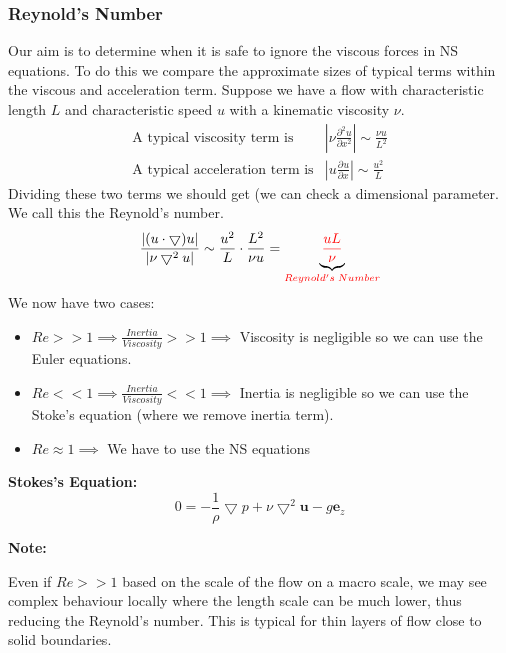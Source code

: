 \documentclass[11pt]{article}
\newcommand*{\pd}[3][]{\ensuremath{\frac{\partial^{#1} {#2}}{\partial {#3}^{#1}}}}
\newcommand{\grad}{\bigtriangledown}
\newcommand{\mv}[1]{\textbf{#1}}
\newcommand{\mdf}[1]{{\color{red}#1}}
\newenvironment{note}
    {\textbf{Note:}\begin{mdframed}[backgroundcolor=white, roundcorner=5pt, linewidth=0pt]}
    {\end{mdframed}}
\newenvironment{formula}
	{\begin{mdframed}[backgroundcolor=white, roundcorner=5pt, linewidth=1pt, linecolor=red]}
	{\end{mdframed}}
\begin{document}
\subsubsection{Reynold's Number}
Our aim is to determine when it is safe to ignore the viscous forces in NS equations.
To do this we compare the approximate sizes of typical terms within the viscous and acceleration term.
Suppose we have a flow with characteristic length $L$ and characteristic speed $u$ with a kinematic viscosity $\nu$.
\begin{align*}
	\text{A typical viscosity term is} &\left|\nu\pd[2]{u}{x}\right|\sim\frac{\nu u}{L^2}\\
	\text{A typical acceleration term is} &\left|u\pd{u}{x}\right|\sim\frac{u^2}{L}
\end{align*}
Dividing these two terms we should get (we can check a dimensional parameter. We call this the \mdf{Reynold's number}.
$$\frac{|(u\cdot\grad)u|}{|\nu\grad^2 u|}\sim \frac{u^2}{L}\cdot\frac{L^2}{\nu u}=\underbrace{\mdf{\frac{uL}{\nu}}}_{\mdf{Reynold's\;Number}}$$
We now have two cases:
\begin{itemize}
	\item $Re >> 1 \implies \frac{Inertia}{Viscosity} >> 1 \implies$ Viscosity is negligible so we can use the Euler equations.
	\item $Re << 1 \implies \frac{Inertia}{Viscosity} << 1 \implies$ Inertia is negligible so we can use the Stoke's equation (where we remove inertia term).
	\item $Re \approx 1 \implies$ We have to use the NS equations
\end{itemize}
\begin{formula}
	\textbf{Stokes's Equation:}
	$$0=-\frac{1}{\rho}\grad{p}+\nu\grad^2\mv{u}-g\mv{e}_z$$
\end{formula}
\begin{note}
Even if $Re >> 1$ based on the scale of the flow on a macro scale, we may see complex behaviour locally where the length scale can be much lower, thus reducing the Reynold's number. This is typical for thin layers of flow close to solid boundaries.
\end{note}
\end{document}
